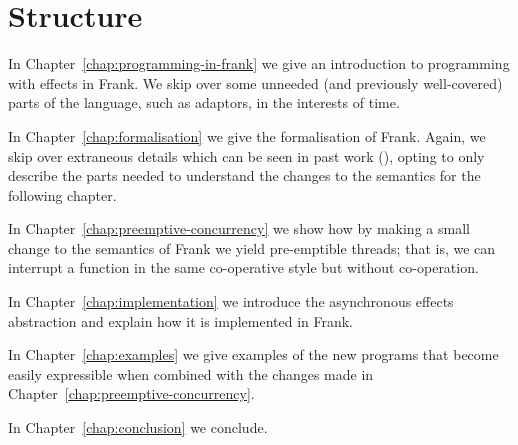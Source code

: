 \documentclass[msc,deptreport,cs]{infthesis} %
\begin{document}


\section{Structure}

In Chapter~\ref{chap:programming-in-frank} we give an introduction to
programming with effects in Frank. We skip over some unneeded (and previously
well-covered) parts of the language, such as adaptors, in the interests of time.

In Chapter~\ref{chap:formalisation} we give the formalisation of Frank. Again,
we skip over extraneous details which can be seen in past work
(\cite{convent2020doo}), opting to only describe the parts needed to understand
the changes to the semantics for the following chapter.

In Chapter~\ref{chap:preemptive-concurrency} we show how by making a small
change to the semantics of Frank we yield pre-emptible threads; that is, we can
interrupt a function in the same co-operative style but without co-operation.

In Chapter~\ref{chap:implementation} we introduce the asynchronous effects
abstraction and explain how it is implemented in Frank.

In Chapter~\ref{chap:examples} we give examples of the new programs that become
easily expressible when combined with the changes made in
Chapter~\ref{chap:preemptive-concurrency}.

In Chapter~\ref{chap:conclusion} we conclude.

\end{document}
